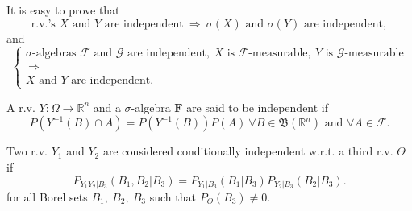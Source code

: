 It is easy to prove that
\begin{equation*}
\text{r.v.'s }X\text{ and }Y\text{ are independent}
~\Rightarrow~
\sigma(X)\text{ and }\sigma(Y)\text{ are independent},
\end{equation*}
and
\begin{equation*}
\left\{
\begin{array}{c}
\sigma\text{-algebras }\mathcal{F}\text{ and }\mathcal{G}\text{ are independent},~X\text{ is }\mathcal{F}\text{-measurable},~Y\text{ is }\mathcal{G}\text{-measurable} \\
~\Rightarrow~ \\
X\text{ and }Y\text{ are independent}.
\end{array}
\right.
\end{equation*}

A r.v. $Y:\Omega\rightarrow\mathbb{R}^n$ and a $\sigma$-algebra $\mathbf{F}$ are said to be independent if
\begin{equation}\label{eq-Y-F-independent}
P(Y^{-1}(B)\cap A) = P(Y^{-1}(B))P(A)~\forall B\in\mathfrak{B}(\mathbb{R}^n)\text{ and }\forall A\in\mathcal{F}.
\end{equation}

Two r.v. $Y_1$ and $Y_2$ are considered conditionally independent w.r.t. a third r.v. $\Theta$ if
\begin{equation*}
P_{Y_1Y_2|B_3}(B_1,B_2|B_3) = P_{Y_1|B_3}(B_1|B_3)P_{Y_2|B_3}(B_2|B_3).
\end{equation*}
for all Borel sets $B_1,~B_2,~B_3$ such that $P_{\Theta}(B_3)\neq 0$.


